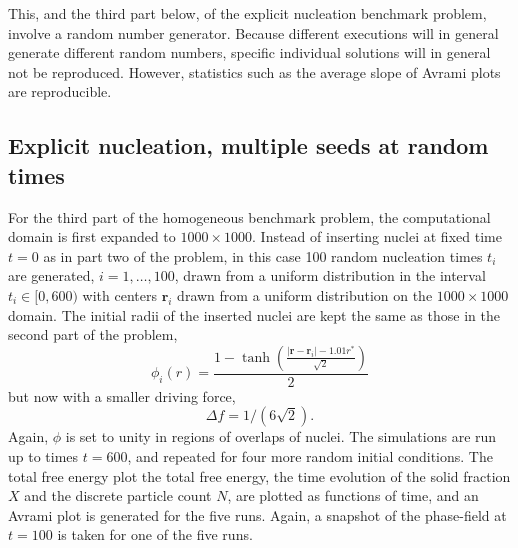 \documentclass[preprint,12pt]{elsarticle}
\begin{document}
This, and the third part below, of the explicit nucleation benchmark problem, involve a random number generator. Because different executions will in general generate different random numbers, specific individual solutions will in general not be reproduced. However, statistics such as the average slope of Avrami plots are reproducible.

\subsection{Explicit nucleation, multiple seeds at random times}
%
For the third part of the homogeneous benchmark problem, the computational domain is first expanded to $1000 \times1000$. Instead of inserting nuclei at fixed time $t = 0$ as in part two of the problem, in this case 100 random nucleation times $t_i$ are generated, $i=1,\ldots,100$, drawn from a uniform distribution in the interval $t_i \in [0, 600)$ with centers $\mathbf{r}_i$ drawn from a uniform distribution on the $1000\times1000$ domain. %
The initial radii of the inserted nuclei are kept the same as those in the second part of the problem, 
\begin{equation}
    \phi_i(r)=\frac{1-\tanh\left(
    \frac{|\mathbf{r}-\mathbf{r}_i|-1.01r^*}{\sqrt{2}}
    \right)}{2}
\end{equation}
but now with a smaller driving force, 
\begin{equation}
\Delta f=1/(6\sqrt{2}).
\end{equation}
%
Again, $\phi$ is set to unity in regions of overlaps of nuclei. The simulations are run up to times $t=600$, and repeated for four more random initial conditions.  The total free energy plot the total free energy, the time evolution of the solid fraction $X$ and the discrete particle count $N$, are plotted as functions of time, and an  Avrami plot is generated for the five runs. Again, a snapshot of the phase-field at $t = 100$ is taken for one of the five runs. %
\end{document}
